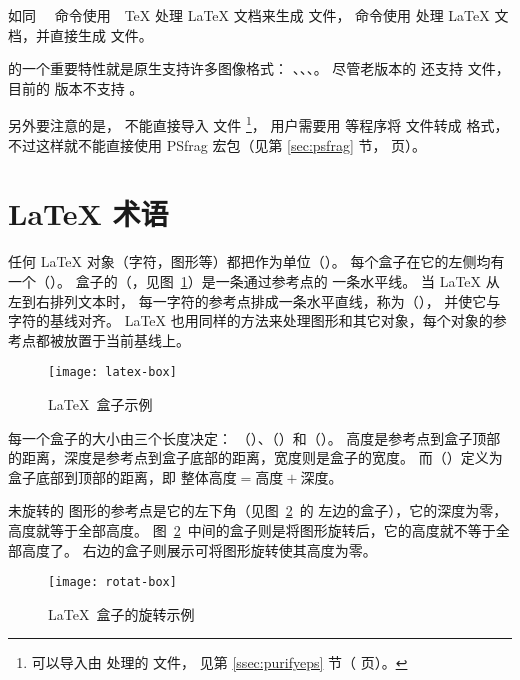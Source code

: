 如同 　命令使用　\TeX{} 处理 \LaTeX{} 文档来生成  文件，
 命令使用 \pdfTeX{} 处理 \LaTeX{} 文档，并直接生成  文件。
 
\pdfTeX{} 的一个重要特性就是原生支持许多图像格式：
、、、。
尽管老版本的 \pdfTeX{} 还支持  文件，目前的 \pdfTeX{} 版本不支持 。

另外要注意的是，\pdfTeX{} 不能直接导入  文件
\footnote{\pdfTeX{} 可以导入由  处理的  文件，
	见第 \ref{ssec:purifyeps} 节（\pageref{ssec:purifyeps} 页）。}，
用户需要用  等程序将  文件转成  格式，
不过这样就不能直接使用 PSfrag 宏包（见第 \ref{sec:psfrag} 节，\pageref{sec:psfrag} 页）。

\section{\LaTeX{} 术语}\label{sec:terminology}

任何 \LaTeX{} 对象（字符，图形等）都把作为单位（\cite[page 103]{Leslie}）。
每个盒子在它的左侧均有一个（）。
盒子的（，见图~\ref{fig:samplebox}）是一条通过参考点的
一条水平线。
当 \LaTeX{} 从左到右排列文本时，
每一字符的参考点排成一条水平直线，称为（），
并使它与字符的基线对齐。
\LaTeX{} 也用同样的方法来处理图形和其它对象，每个对象的参考点都被放置于当前基线上。

\begin{figure}
	\centering
	\texttt{[image: latex-box]}
	\caption{\LaTeX{}~盒子示例}
	\label{fig:samplebox}
\end{figure}

每一个盒子的大小由三个长度决定：
（）、（）和（）。
高度是参考点到盒子顶部的距离，深度是参考点到盒子底部的距离，宽度则是盒子的宽度。
而（）定义为盒子底部到顶部的距离，即
$\text{整体高度} = \text{高度} + \text{深度}$。

未旋转的  图形的参考点是它的左下角（见图~\ref{fig:rotate-box}~的
左边的盒子），它的深度为零，高度就等于全部高度。
图~\ref{fig:rotate-box}~中间的盒子则是将图形旋转后，它的高度就不等于全部高度了。
右边的盒子则展示可将图形旋转使其高度为零。

\begin{figure}
	\centering
	\texttt{[image: rotat-box]}
	\caption{\LaTeX{}~盒子的旋转示例}\label{fig:rotate-box}
\end{figure}



